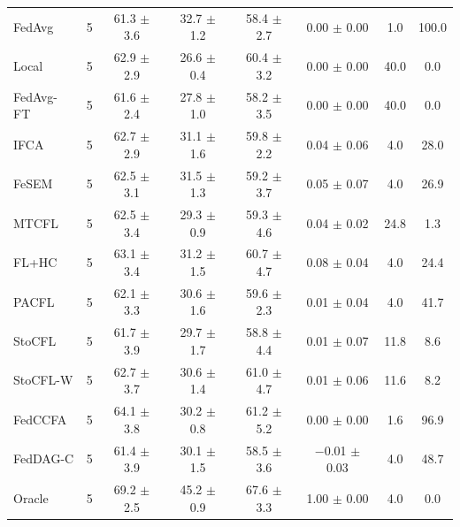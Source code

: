 {\begin{tabular}{l r c c c c c c}
FedAvg & 5 & 61.3 $\pm$ 3.6 & 32.7 $\pm$ 1.2 & 58.4 $\pm$ 2.7 & 0.00 $\pm$ 0.00 & 1.0 & 100.0 \\
Local & 5 & 62.9 $\pm$ 2.9 & 26.6 $\pm$ 0.4 & 60.4 $\pm$ 3.2 & 0.00 $\pm$ 0.00 & 40.0 & 0.0 \\
FedAvg-FT & 5 & 61.6 $\pm$ 2.4 & 27.8 $\pm$ 1.0 & 58.2 $\pm$ 3.5 & 0.00 $\pm$ 0.00 & 40.0 & 0.0 \\
IFCA & 5 & 62.7 $\pm$ 2.9 & 31.1 $\pm$ 1.6 & 59.8 $\pm$ 2.2 & 0.04 $\pm$ 0.06 & 4.0 & 28.0 \\
FeSEM & 5 & 62.5 $\pm$ 3.1 & 31.5 $\pm$ 1.3 & 59.2 $\pm$ 3.7 & 0.05 $\pm$ 0.07 & 4.0 & 26.9 \\
MTCFL & 5 & 62.5 $\pm$ 3.4 & 29.3 $\pm$ 0.9 & 59.3 $\pm$ 4.6 & 0.04 $\pm$ 0.02 & 24.8 & 1.3 \\
FL+HC & 5 & 63.1 $\pm$ 3.4 & 31.2 $\pm$ 1.5 & 60.7 $\pm$ 4.7 & 0.08 $\pm$ 0.04 & 4.0 & 24.4 \\
PACFL & 5 & 62.1 $\pm$ 3.3 & 30.6 $\pm$ 1.6 & 59.6 $\pm$ 2.3 & 0.01 $\pm$ 0.04 & 4.0 & 41.7 \\
StoCFL & 5 & 61.7 $\pm$ 3.9 & 29.7 $\pm$ 1.7 & 58.8 $\pm$ 4.4 & 0.01 $\pm$ 0.07 & 11.8 & 8.6 \\
StoCFL-W & 5 & 62.7 $\pm$ 3.7 & 30.6 $\pm$ 1.4 & 61.0 $\pm$ 4.7 & 0.01 $\pm$ 0.06 & 11.6 & 8.2 \\
FedCCFA & 5 & 64.1 $\pm$ 3.8 & 30.2 $\pm$ 0.8 & 61.2 $\pm$ 5.2 & 0.00 $\pm$ 0.00 & 1.6 & 96.9 \\
FedDAG-C & 5 & 61.4 $\pm$ 3.9 & 30.1 $\pm$ 1.5 & 58.5 $\pm$ 3.6 & $-$0.01 $\pm$ 0.03 & 4.0 & 48.7 \\
Oracle & 5 & 69.2 $\pm$ 2.5 & 45.2 $\pm$ 0.9 & 67.6 $\pm$ 3.3 & 1.00 $\pm$ 0.00 & 4.0 & 0.0 \\
\bottomrule
\end{tabular}
}

